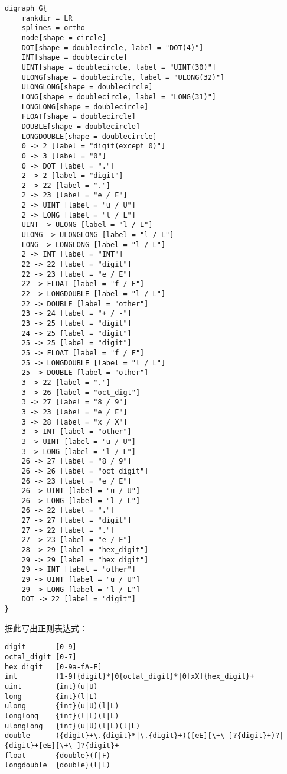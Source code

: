 \documentclass[lang=cn,11pt,a4paper]{paper}
\begin{document}
\begin{lstlisting}
digraph G{
    rankdir = LR
    splines = ortho
    node[shape = circle]
    DOT[shape = doublecircle, label = "DOT(4)"]
    INT[shape = doublecircle]
    UINT[shape = doublecircle, label = "UINT(30)"]
    ULONG[shape = doublecircle, label = "ULONG(32)"]
    ULONGLONG[shape = doublecircle]
    LONG[shape = doublecircle, label = "LONG(31)"]
    LONGLONG[shape = doublecircle]
    FLOAT[shape = doublecircle]
    DOUBLE[shape = doublecircle]
    LONGDOUBLE[shape = doublecircle]
    0 -> 2 [label = "digit(except 0)"]
    0 -> 3 [label = "0"]
    0 -> DOT [label = "."]
    2 -> 2 [label = "digit"]
    2 -> 22 [label = "."]
    2 -> 23 [label = "e / E"]
    2 -> UINT [label = "u / U"]
    2 -> LONG [label = "l / L"]
    UINT -> ULONG [label = "l / L"]
    ULONG -> ULONGLONG [label = "l / L"]
    LONG -> LONGLONG [label = "l / L"]
    2 -> INT [label = "INT"]
    22 -> 22 [label = "digit"]
    22 -> 23 [label = "e / E"]
    22 -> FLOAT [label = "f / F"]
    22 -> LONGDOUBLE [label = "l / L"]
    22 -> DOUBLE [label = "other"]
    23 -> 24 [label = "+ / -"]
    23 -> 25 [label = "digit"]
    24 -> 25 [label = "digit"]
    25 -> 25 [label = "digit"]
    25 -> FLOAT [label = "f / F"]
    25 -> LONGDOUBLE [label = "l / L"]
    25 -> DOUBLE [label = "other"]
    3 -> 22 [label = "."]
    3 -> 26 [label = "oct_digt"]
    3 -> 27 [label = "8 / 9"]
    3 -> 23 [label = "e / E"]
    3 -> 28 [label = "x / X"]
    3 -> INT [label = "other"]
    3 -> UINT [label = "u / U"]
    3 -> LONG [label = "l / L"]
    26 -> 27 [label = "8 / 9"]
    26 -> 26 [label = "oct_digit"]
    26 -> 23 [label = "e / E"]
    26 -> UINT [label = "u / U"]
    26 -> LONG [label = "l / L"]
    26 -> 22 [label = "."]
    27 -> 27 [label = "digit"]
    27 -> 22 [label = "."]
    27 -> 23 [label = "e / E"]
    28 -> 29 [label = "hex_digit"]
    29 -> 29 [label = "hex_digit"]
    29 -> INT [label = "other"]
    29 -> UINT [label = "u / U"]
    29 -> LONG [label = "l / L"]
    DOT -> 22 [label = "digit"]
}
\end{lstlisting}

据此写出正则表达式：

\begin{lstlisting}
digit     	[0-9]
octal_digit [0-7]
hex_digit 	[0-9a-fA-F]
int 		[1-9]{digit}*|0{octal_digit}*|0[xX]{hex_digit}+
uint		{int}(u|U)
long		{int}(l|L)
ulong		{int}(u|U)(l|L)
longlong	{int}(l|L)(l|L)
ulonglong	{int}(u|U)(l|L)(l|L)
double 		({digit}+\.{digit}*|\.{digit}+)([eE][\+\-]?{digit}+)?|{digit}+[eE][\+\-]?{digit}+
float		{double}(f|F)
longdouble	{double}(l|L)
\end{lstlisting}
\end{document}

